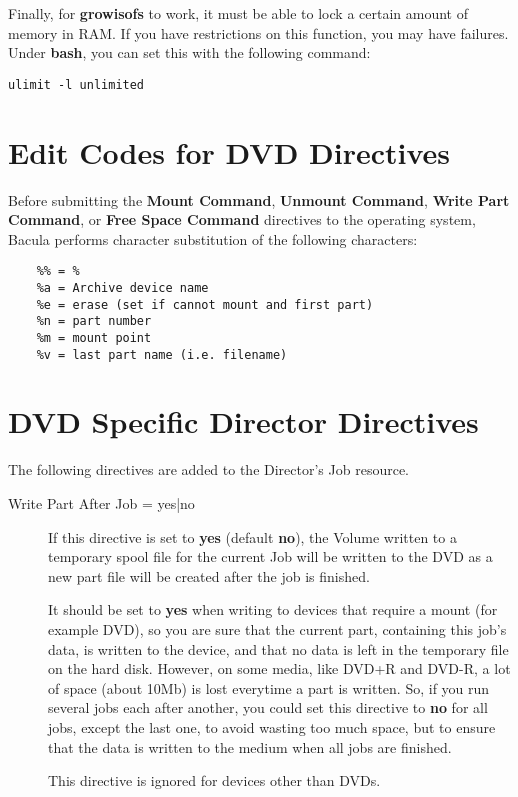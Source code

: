 Finally, for {\bf growisofs} to work, it must be able to lock
a certain amount of memory in RAM.  If you have restrictions on
this function, you may have failures.  Under {\bf bash}, you can
set this with the following command:

\footnotesize  
\begin{verbatim}
ulimit -l unlimited
\end{verbatim}
\normalsize

\section{Edit Codes for DVD Directives} 

Before submitting the {\bf Mount Command}, {\bf Unmount Command}, 
{\bf Write Part Command}, or {\bf Free Space Command} directives 
to the operating system, Bacula performs character substitution of the
following characters:

\footnotesize
\begin{verbatim}
    %% = %
    %a = Archive device name
    %e = erase (set if cannot mount and first part)
    %n = part number
    %m = mount point
    %v = last part name (i.e. filename)
\end{verbatim}
\normalsize



\section{DVD Specific Director Directives} 

The following directives are added to the Director's Job resource.
    
\label{WritePartAfterJob}
\begin{description}
\item [Write Part After Job = \lt{}yes|no\gt{}]
   If this directive is set to {\bf yes} (default {\bf no}), the
   Volume written to a temporary spool file for the current Job will
   be written to the DVD as a new part file
   will be created after the job is finished.  

   It should be set to {\bf yes} when writing to devices that require a mount
   (for example DVD), so you are sure that the current part, containing
   this job's data, is written to the device, and that no data is left in
   the temporary file on the hard disk.  However, on some media, like DVD+R
   and DVD-R, a lot of space (about 10Mb) is lost everytime a part is
   written.  So, if you run several jobs each after another, you could set
   this directive to {\bf no} for all jobs, except the last one, to avoid
   wasting too much space, but to ensure that the data is written to the
   medium when all jobs are finished.

   This directive is ignored for devices other than DVDs.
\end{description}



